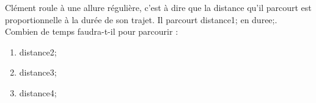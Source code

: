 \documentclass[exercice]{thedocument}%
\begin{document}
%
Clément roule à une allure régulière, c'est à dire que la distance qu'il
parcourt est proportionnelle à la durée de son trajet. Il parcourt \<distance1;
en \<duree;.\vskip10pt Combien de temps faudra-t-il pour parcourir :
\begin{enumerate}
    \item \<distance2;
    \item \<distance3;
    \item \<distance4;
\end{enumerate}
\end{document}
